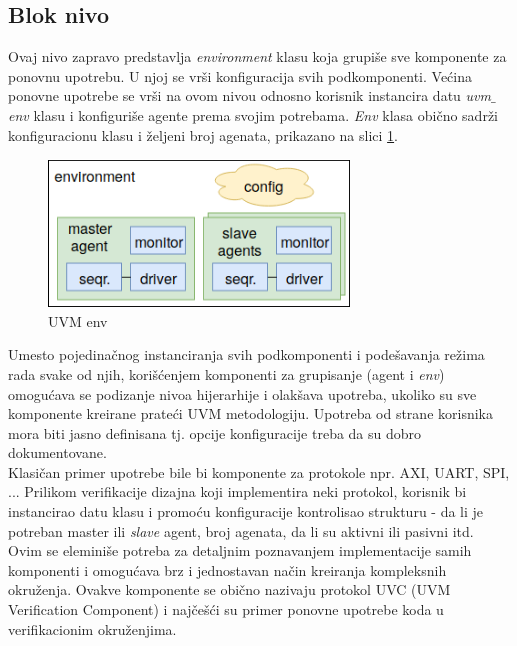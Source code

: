 
\subsection{Blok nivo}

Ovaj nivo zapravo predstavlja \emph{environment} klasu koja grupiše sve
komponente za ponovnu upotrebu. U njoj se vrši konfiguracija svih podkomponenti.
Većina ponovne upotrebe se vrši na ovom nivou odnosno korisnik instancira datu
\emph{uvm\(\_\)env} klasu i konfiguriše agente prema svojim potrebama.
\emph{Env} klasa obično sadrži konfiguracionu klasu i željeni broj agenata,
prikazano na slici \ref{fig:block_env}.\\

\begin{figure}[h!]
  \centering
  \includegraphics[width=80mm]{img/v9_block_env.png}
  \caption{UVM env}
  \label{fig:block_env}
\end{figure}

Umesto pojedinačnog instanciranja svih podkomponenti i podešavanja režima rada
svake od njih, korišćenjem komponenti za grupisanje (agent i \emph{env})
omogućava se podizanje nivoa hijerarhije i olakšava upotreba, ukoliko su sve
komponente kreirane prateći UVM metodologiju. Upotreba od strane korisnika mora
biti jasno definisana tj. opcije konfiguracije treba da su dobro
dokumentovane.\\

Klasičan primer upotrebe bile bi komponente za protokole npr. AXI, UART, SPI,
... Prilikom verifikacije dizajna koji implementira neki protokol, korisnik bi
instancirao datu klasu i promoću konfiguracije kontrolisao strukturu - da li je
potreban master ili \emph{slave} agent, broj agenata, da li su aktivni ili
pasivni itd. Ovim se eleminiše potreba za detaljnim poznavanjem implementacije
samih komponenti i omogućava brz i jednostavan način kreiranja kompleksnih
okruženja. Ovakve komponente se obično nazivaju protokol UVC (UVM Verification
Component) i najčešći su primer ponovne upotrebe koda u verifikacionim
okruženjima.

